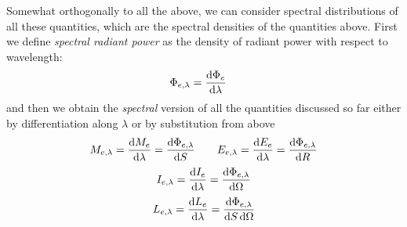 Somewhat orthogonally to all the above, we can consider spectral distributions
of all these quantities, which are the spectral densities of the
quantities above. First we define \textsl{spectral radiant power} as the density of
radiant power with respect to wavelength:
\begin{displaymath}
	\Phi_{e,\lambda} = \frac{\mathop{}\!\mathrm{d}\Phi_e}{\mathop{}\!\mathrm{d}\lambda} \quad
\end{displaymath}
and then we obtain the \textsl{spectral} version of all the quantities discussed so far
either by differentiation along $\lambda$ or by substitution from above
\begin{displaymath}
	M_{e,\lambda} = \frac{\d M_e}{\d\lambda} = \frac{\d\Phi_{e,\lambda}}{\d S} \qquad
	E_{e,\lambda} = \frac{\d E_e}{\d\lambda} = \frac{\d\Phi_{e,\lambda}}{\d R} 
\end{displaymath}
\begin{displaymath}
	I_{e,\lambda} = \frac{\mathop{}\!\mathrm{d} I_e}{\mathop{}\!\mathrm{d}\lambda} = \frac{\mathop{}\!\mathrm{d}\Phi_{e,\lambda}}{\mathop{}\!\mathrm{d}\Omega} 
\end{displaymath}
\begin{displaymath}
	L_{e,\lambda} = \frac{\mathop{}\!\mathrm{d} L_e}{\mathop{}\!\mathrm{d}\lambda} = \frac{\mathop{}\!\mathrm{d}\Phi_{e,\lambda}}{\mathop{}\!\mathrm{d} S \mathop{}\!\mathrm{d}\Omega} 
\end{displaymath}



